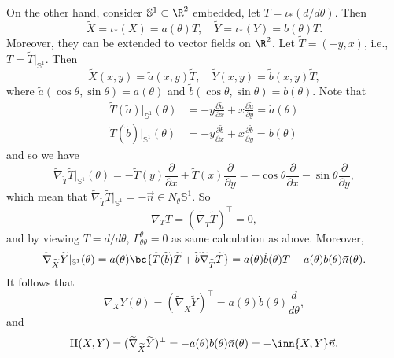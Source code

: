 \begin{enumerate}[label=\arabic{*}.]
    On the other hand, consider $\mathbb{S}^1 \subset \R^2$ embedded, let $T = \iota_*(d/d\theta)$. Then
    \begin{equation*}
        \widetilde{X} = \iota_*(X) = a(\theta)T,\quad \widetilde{Y} = \iota_*(Y) = b(\theta)T.
    \end{equation*}
    Moreover, they can be extended to vector fields on $\R^2$. Let $\widetilde{T} = (-y,x)$, i.e., $T = \widetilde{T}|_{\mathbb{S}^1}$. Then
    \begin{equation*}
        \widetilde{X}(x,y) = \widetilde{a}(x,y)\widetilde{T},\quad \widetilde{Y}(x,y) = \widetilde{b}(x,y)\widetilde{T},
    \end{equation*}
    where $\widetilde{a}(\cos \theta,\sin \theta) = a(\theta)$ and $\widetilde{b}(\cos \theta,\sin \theta) = b(\theta)$. Note that
    \begin{align*}
        \widetilde{T}(\widetilde{a})|_{\mathbb{S}^1}(\theta) &= -y\frac{\partial \widetilde{a}}{\partial x} + x\frac{\partial \widetilde{a}}{\partial y} = \dot{a}(\theta) \\
        \widetilde{T}(\widetilde{b})|_{\mathbb{S}^1}(\theta) &= -y\frac{\partial \widetilde{b}}{\partial x} + x\frac{\partial \widetilde{b}}{\partial y} = \dot{b}(\theta)
    \end{align*}
    and so we have
    \begin{equation*}
        \widetilde{\nabla}_{\widetilde{T}}\widetilde{T}|_{\mathbb{S}^1}(\theta) = -\widetilde{T}(y) \frac{\partial}{\partial x} + \widetilde{T}(x) \frac{\partial}{\partial y} = -\cos \theta \frac{\partial}{\partial x}  - \sin \theta \frac{\partial}{\partial y},
    \end{equation*}
    which mean that $\widetilde{\nabla}_{\widetilde{T}}\widetilde{T}|_{\mathbb{S}^1} = -\vec{n} \in N_\theta\mathbb{S}^1$. So
    \begin{equation*}
        \nabla_TT = (\widetilde{\nabla}_{\widetilde{T}}\widetilde{T})^\top = 0,
    \end{equation*}
    and by viewing $T = d / d\theta$, $\Gamma^\theta_{\theta \theta} = 0$ as same calculation as above. Moreover,
    \begin{equation*}
        \widetilde{\nabla}_{\widetilde{X}}\widetilde{Y}|_{\mathbb{S}^1}(\theta) = a(\theta)\bc{\widetilde{T}(\widetilde{b})\widetilde{T} + \widetilde{b}\widetilde{\nabla}_{\widetilde{T}}\widetilde{T}} = a(\theta)\dot{b}(\theta)T - a(\theta)b(\theta)\vec{n}(\theta).
    \end{equation*}
    It follows that
    \begin{equation*}
        \nabla_XY(\theta) = (\widetilde{\nabla}_{\widetilde{X}}\widetilde{Y})^\top = a(\theta)\dot{b}(\theta)\frac{d}{d \theta},
    \end{equation*}
    and
    \begin{equation*}
        \mathrm{II}(X,Y) = (\widetilde{\nabla}_{\widetilde{X}}\widetilde{Y})^\perp = - a(\theta)b(\theta)\vec{n}(\theta) = -\inn{X,Y}\vec{n}.
    \end{equation*}


\end{enumerate}
